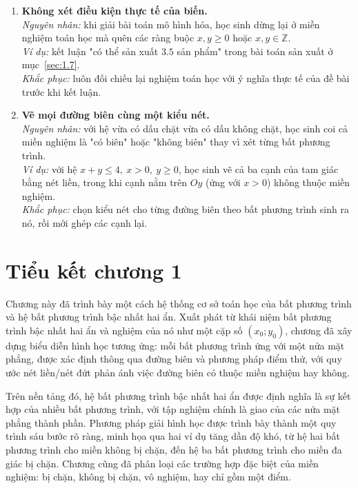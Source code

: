 \documentclass[12pt,a4paper]{report}
\begin{document}
\begin{enumerate}[label=\textbf{(\arabic*)}, leftmargin=1.6cm]
\item \textbf{Không xét điều kiện thực tế của biến.}\\
\textit{Nguyên nhân:} khi giải bài toán mô hình hóa, học sinh dừng lại ở miền nghiệm toán học mà quên các ràng buộc $x,y\ge0$ hoặc $x,y\in\mathbb{Z}$.\\
\textit{Ví dụ:} kết luận "có thể sản xuất $3.5$ sản phẩm" trong bài toán sản xuất ở mục~\ref{sec:1.7}.\\
\textit{Khắc phục:} luôn đối chiếu lại nghiệm toán học với ý nghĩa thực tế của đề bài trước khi kết luận.
\item \textbf{Vẽ mọi đường biên cùng một kiểu nét.}\\
\textit{Nguyên nhân:} với hệ vừa có dấu chặt vừa có dấu không chặt, học sinh coi cả miền nghiệm là "có biên" hoặc "không biên" thay vì xét từng bất phương trình.\\
\textit{Ví dụ:} với hệ $x+y\le 4,\ x>0,\ y\ge 0$, học sinh vẽ cả ba cạnh của tam giác bằng nét liền, trong khi cạnh nằm trên $Oy$ (ứng với $x>0$) không thuộc miền nghiệm.\\
\textit{Khắc phục:} chọn kiểu nét cho từng đường biên theo bất phương trình sinh ra nó, rồi mới ghép các cạnh lại.

\end{enumerate}



\section{Tiểu kết chương 1}
\label{sec:1.10}

Chương này đã trình bày một cách hệ thống cơ sở toán học của bất phương trình và hệ bất phương trình bậc nhất hai ẩn. Xuất phát từ khái niệm bất phương trình bậc nhất hai ẩn và nghiệm của nó như một cặp số $(x_0;y_0)$, chương đã xây dựng biểu diễn hình học tương ứng: mỗi bất phương trình ứng với một nửa mặt phẳng, được xác định thông qua đường biên và phương pháp điểm thử, với quy ước nét liền/nét đứt phản ánh việc đường biên có thuộc miền nghiệm hay không.

Trên nền tảng đó, hệ bất phương trình bậc nhất hai ẩn được định nghĩa là sự kết hợp của nhiều bất phương trình, với tập nghiệm chính là giao của các nửa mặt phẳng thành phần. Phương pháp giải hình học được trình bày thành một quy trình sáu bước rõ ràng, minh họa qua hai ví dụ tăng dần độ khó, từ hệ hai bất phương trình cho miền không bị chặn, đến hệ ba bất phương trình cho miền đa giác bị chặn. Chương cũng đã phân loại các trường hợp đặc biệt của miền nghiệm: bị chặn, không bị chặn, vô nghiệm, hay chỉ gồm một điểm.
\end{document}
